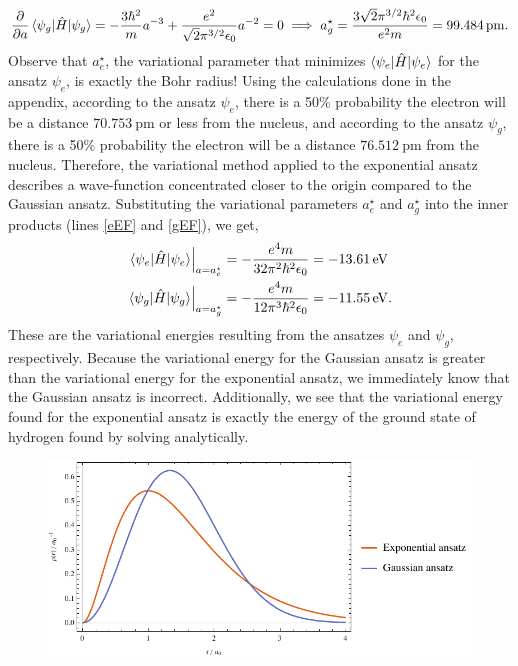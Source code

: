 \documentclass[10pt]{article}
\newcommand{\1}{\mathbf 1}
\begin{document}
\begin{align}
	\frac{\partial}{\partial a}
	\braket{\psi_g | \hat H |\psi_g}
	=
	-
	\frac{3\hbar^2}{m}a^{-3}
	+
	\frac{e^2}{\sqrt{2}  \pi^{3/2}\epsilon_0}a^{-2}
	=
	0
	\implies
	a_g^\star =
	\frac{3 \sqrt{2} \pi^{3/2} \hbar^2 \epsilon_0}{e^2 m }
	=
	\SI{99.484}{\pico\metre}.
\end{align}
Observe that $a_e^\star$, the variational parameter that minimizes $	\braket{\psi_e | \hat H |\psi_e}$ for the ansatz $\psi_e$, is exactly the Bohr radius!
Using the calculations done in the appendix, according to the ansatz $\psi_e$, there is a 50\% probability the electron will be a distance $\SI{70.753}{\pico\metre}$ or less from the nucleus, and according to the ansatz $\psi_g$, there is a 50\% probability the electron will be a distance $\SI{76.512}{\pico\metre}$ from the nucleus.
Therefore, the variational method applied to the exponential ansatz describes a wave-function concentrated closer to the origin compared to the Gaussian ansatz.
Substituting the variational parameters $a_e^\star$ and $a_g^\star$ into the inner products (lines \ref{eEF} and \ref{gEF}), we get,
\begin{align}
	\left.\braket{\psi_e | \hat H | \psi_e}\right|_{a = a_e^\star}
	&=
	-
	\frac{e^4 m}{32 \pi^2 \hbar^2 \epsilon_0}
	=
	-\SI{13.61}{\electronvolt}
	\\
	\left.\braket{\psi_g | \hat H | \psi_g}\right|_{a = a_g^\star}
	&=
	-\frac{e^4m}{12 \pi^3\hbar^2 \epsilon_0}
	=
	-\SI{11.55}{\electronvolt}.
\end{align}
These are the variational energies resulting from the ansatzes $\psi_e$ and $\psi_g$, respectively.
Because the variational energy for the Gaussian ansatz is greater than the variational energy for the exponential ansatz, we immediately know that the Gaussian ansatz is incorrect.
Additionally, we see that the variational energy found for the exponential ansatz is exactly the energy of the ground state of hydrogen found by solving analytically.

\begin{figure}[!h]
	\centering
	\includegraphics{vary-plt.pdf}
\end{figure}
\end{document}
